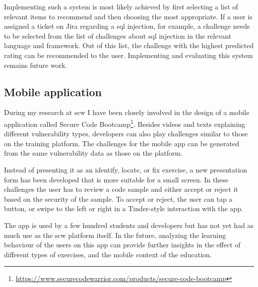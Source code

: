 Implementing such a system is most likely achieved by first selecting a list of relevant items to recommend and then choosing the most appropriate.
If a user is assigned a ticket on Jira regarding a \gls{sql} injection, for example, a challenge needs to be selected from the list of challenges about \gls{sql} injection in the relevant language and framework.
Out of this list, the challenge with the highest predicted rating can be recommended to the user.
Implementing and evaluating this system remains future work.

\subsection{Mobile application}
During my research at \gls{scw} I have been closely involved in the design of a mobile application called Secure Code Bootcamp\footnote{\url{https://www.securecodewarrior.com/products/secure-code-bootcamp}}.
Besides videos and texts explaining different vulnerability types, developers can also play challenges similar to those on the training platform.
The challenges for the mobile app can be generated from the same vulnerability data as those on the platform.

Instead of presenting it as an identify, locate, or fix exercise, a new presentation form has been developed that is more suitable for a small screen.
In these challenges the user has to review a code sample and either accept or reject it based on the security of the sample.
To accept or reject, the user can tap a button, or swipe to the left or right in a Tinder-style interaction with the app. 

The app is used by a few hundred students and developers but has not yet had as much use as the \gls{scw} platform itself.
In the future, analyzing the learning behaviour of the users on this app can provide further insights in the effect of different types of exercises, and the mobile context of the education.